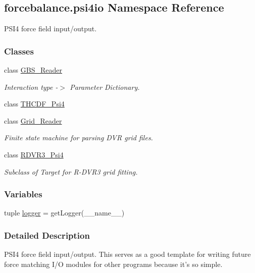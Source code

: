 \hypertarget{namespaceforcebalance_1_1psi4io}{\subsection{forcebalance.\-psi4io Namespace Reference}
\label{namespaceforcebalance_1_1psi4io}
}


P\-S\-I4 force field input/output.  


\subsubsection*{Classes}
\begin{DoxyCompactItemize}
\item 
class \hyperlink{classforcebalance_1_1psi4io_1_1GBS__Reader}{G\-B\-S\-\_\-\-Reader}
\begin{DoxyCompactList}\small\item\em Interaction type -\/$>$ Parameter Dictionary. \end{DoxyCompactList}\item 
class \hyperlink{classforcebalance_1_1psi4io_1_1THCDF__Psi4}{T\-H\-C\-D\-F\-\_\-\-Psi4}
\item 
class \hyperlink{classforcebalance_1_1psi4io_1_1Grid__Reader}{Grid\-\_\-\-Reader}
\begin{DoxyCompactList}\small\item\em Finite state machine for parsing D\-V\-R grid files. \end{DoxyCompactList}\item 
class \hyperlink{classforcebalance_1_1psi4io_1_1RDVR3__Psi4}{R\-D\-V\-R3\-\_\-\-Psi4}
\begin{DoxyCompactList}\small\item\em Subclass of Target for R-\/\-D\-V\-R3 grid fitting. \end{DoxyCompactList}\end{DoxyCompactItemize}
\subsubsection*{Variables}
\begin{DoxyCompactItemize}
\item 
tuple \hyperlink{namespaceforcebalance_1_1psi4io_a171636f825fb778b0f8ada7e9f978dae}{logger} = get\-Logger(\-\_\-\-\_\-name\-\_\-\-\_\-)
\end{DoxyCompactItemize}


\subsubsection{Detailed Description}
P\-S\-I4 force field input/output. This serves as a good template for writing future force matching I/\-O modules for other programs because it's so simple.

